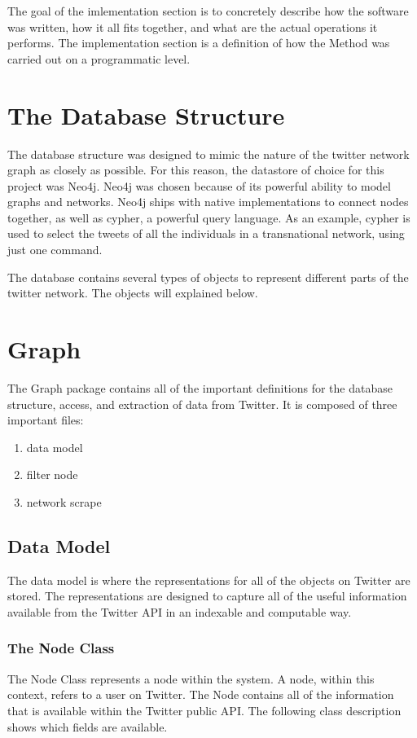 The goal of the imlementation section is to concretely describe how
the software was written, how it all fits together, and what are the
actual operations it performs. The implementation section is a
definition of how the Method was carried out on a programmatic level.

\section{The Database Structure}
The database structure was designed to mimic the nature of the twitter
network graph as closely as possible. For this reason, the datastore
of choice for this project was Neo4j. Neo4j was chosen because of its
powerful ability to model graphs and networks. Neo4j ships with native
implementations to connect nodes together, as well as cypher, a
powerful query language. As an example, cypher is used to select the
tweets of all the individuals in a transnational network, using just
one command.

The database contains several types of objects to represent different
parts of the twitter network. The objects will explained below.

\section{Graph}
The Graph package contains all of the important definitions for the
database structure, access, and extraction of data from Twitter. It is
composed of three important files:

\begin{enumerate}
\item data model
\item filter node
\item network scrape
\end{enumerate}

\subsection{Data Model}
The data model is where the representations for all of the objects on
Twitter are stored. The representations are designed to capture all of
the useful information available from the Twitter API in an indexable
and computable way.

\subsubsection{The Node Class}
The Node Class represents a node within the system. A node, within
this context, refers to a user on Twitter. The Node contains all of
the information that is available within the Twitter public API. The
following class description shows which fields are available.


